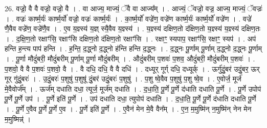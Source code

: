 \documentclass[17pt]{extarticle}
\begin{document}
26. वज्रो॒ वै वै वज्रो॒ वज्रो॒ वै । . वा आज्य॒ माज्यं॒ ॅवै वा आज्य᳚म् । . आज्यं॒ ॅवज्रो॒ वज्र॒ आज्य॒ माज्यं॒ ॅवज्रः॑ । . वज्रः॑ कार्ष्म॒र्यः॑ कार्ष्म॒र्यो॑ वज्रो॒ वज्रः॑ कार्ष्म॒र्यः॑ । . का॒र्ष्म॒र्यो॑ वज्रे॑ण॒ वज्रे॑ण कार्ष्म॒र्यः॑ कार्ष्म॒र्यो॑ वज्रे॑ण । . वज्रे॑ णै॒वैव वज्रे॑ण॒ वज्रे॑णै॒व । . ए॒व य॒ज्ञ्स्य॑ य॒ज्ञ् स्यै॒वैव य॒ज्ञ्स्य॑ । . य॒ज्ञ्स्य॑ दक्षिण॒तो द॑क्षिण॒तो य॒ज्ञ्स्य॑ य॒ज्ञ्स्य॑ दक्षिण॒तः । . द॒क्षि॒ण॒तो रक्षाꣳ॑सि॒ रक्षाꣳ॑सि दक्षिण॒तो द॑क्षिण॒तो रक्षाꣳ॑सि । . रक्षाꣳ॒॒ स्यपाप॒ रक्षाꣳ॑सि॒ रक्षाꣳ॒॒ स्यप॑ । . अप॑ हन्ति ह॒न्त्य पाप॑ हन्ति । . ह॒न्ति॒ द॒द्ध्नो द॒द्ध्नो ह॑न्ति हन्ति द॒द्ध्नः । . द॒द्ध्नः पू॒र्णाम् पू॒र्णाम् द॒द्ध्नो द॒द्ध्नः पू॒र्णाम् । . पू॒र्णा मौदुं॑बरी॒ मौदुं॑बरीम् पू॒र्णाम् पू॒र्णा मौदुं॑बरीम् । . औदुं॑बरीम् प॒शवः॑ प॒शव॒ औदुं॑बरी॒ मौदुं॑बरीम् प॒शवः॑ । . प॒शवो॒ वै वै प॒शवः॑ प॒शवो॒ वै । . वै दधि॒ दधि॒ वै वै दधि॑ । . दध्यूर् गूर्ग् दधि॒ दध्यूर्क् । . ऊर्गु॑दुं॒बर॑ उदुं॒बर॒ ऊर् गूर् गु॑दुं॒बरः॑ । . उ॒दुं॒बरः॑ प॒शुषु॑ प॒शुषू॑ दुं॒बर॑ उदुं॒बरः॑ प॒शुषु॑ । . प॒शु ष्वे॒वैव प॒शुषु॑ प॒शु ष्वे॒व । . ए॒वोर्ज॒ मूर्ज॑ मे॒वैवोर्ज᳚म् । . ऊर्ज॑म् दधाति दधा॒ त्यूर्ज॒ मूर्ज॑म् दधाति । . द॒धा॒ति॒ पू॒र्णे पू॒र्णे द॑धाति दधाति पू॒र्णे । . पू॒र्णे उपोप॑ पू॒र्णे पू॒र्णे उप॑ । . पू॒र्णे इति॑ पू॒र्णे । . उप॑ दधाति दधा॒ त्युपोप॑ दधाति । . द॒धा॒ति॒ पू॒र्णे पू॒र्णे द॑धाति दधाति पू॒र्णे । . पू॒र्णे ए॒वैव पू॒र्णे पू॒र्णे ए॒व । . पू॒र्णे इति॑ पू॒र्णे । . ए॒वैन॑ मेन मे॒वै वैन᳚म् । . ए॒न॒ म॒मुष्मि॑न् न॒मुष्मि॑न् नेन मेन म॒मुष्मिन्न्॑ । \newline
\end{document}
